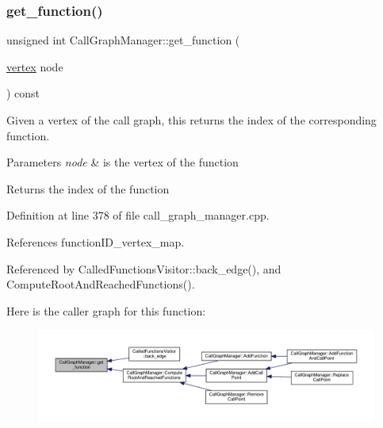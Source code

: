 \subsubsection{\texorpdfstring{get\+\_\+function()}{get\_function()}}
{\footnotesize\ttfamily unsigned int Call\+Graph\+Manager\+::get\+\_\+function (\begin{DoxyParamCaption}\item[{\hyperlink{graph_8hpp_abefdcf0544e601805af44eca032cca14}{vertex}}]{node }\end{DoxyParamCaption}) const}



Given a vertex of the call graph, this returns the index of the corresponding function. 


\begin{DoxyParams}{Parameters}
{\em node} & is the vertex of the function \\
\hline
\end{DoxyParams}
\begin{DoxyReturn}{Returns}
the index of the function 
\end{DoxyReturn}


Definition at line 378 of file call\+\_\+graph\+\_\+manager.\+cpp.



References function\+I\+D\+\_\+vertex\+\_\+map.



Referenced by Called\+Functions\+Visitor\+::back\+\_\+edge(), and Compute\+Root\+And\+Reached\+Functions().

Here is the caller graph for this function\+:
\nopagebreak
\begin{figure}[H]
\begin{center}
\leavevmode
\includegraphics[width=350pt]{d5/d96/classCallGraphManager_a3416f718a1d4e6232d900bc1bb08ae0e_icgraph}
\end{center}
\end{figure}
\mbox{\label{classCallGraphManager_af2f8989f8165d380da23840418d37c14}} 
